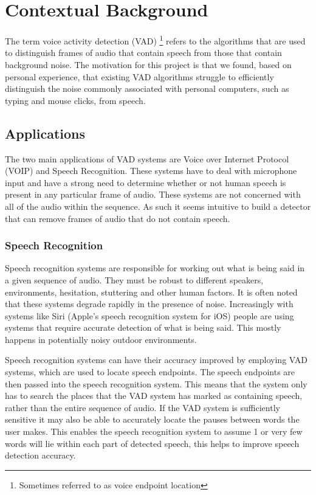 \documentclass[ %
                    author={Sam Phippen},
                supervisor={Dr. Rafal Bogacz},
                     title={Real time voice activity detectors in noisy personal computing environments},
                  subtitle={},
                    degree={MEng},
                      year={2012} ]{thesis}
\begin{document}
\chapter{Contextual Background}
\label{chap:context}

\vspace{1cm}

The term voice activity detection (VAD) \footnote{Sometimes referred to as voice
endpoint location\cite{Tuske}} refers to the algorithms that are used to
distinguish frames of audio that contain speech from those that contain
background noise\cite{ramirez}. The motivation for this project is that we
found, based on personal experience, that existing VAD algorithms struggle to
efficiently distinguish the noise commonly associated with personal computers,
such as typing and mouse clicks, from speech.

\section{Applications}

The two main applications of VAD systems are Voice over Internet Protocol
(VOIP) and Speech Recognition. These systems have to deal with microphone input
and have a strong need to determine whether or not human speech is present in
any particular frame of audio. These systems are not concerned with all of the
audio within the sequence. As such it seems intuitive to build a detector that
can remove frames of audio that do not contain speech.

\subsection{Speech Recognition}

Speech recognition systems are responsible for working out what is being said
in a given sequence of audio. They must be robust to different speakers,
environments, hesitation, stuttering and other human factors. It is often noted
that these systems degrade rapidly in the presence of noise\cite{Moreno}.
Increasingly with systems like Siri\texttrademark\cite{siri} (Apple's speech
recognition system for iOS\texttrademark) people are using systems that require
accurate detection of what is being said. This mostly happens in potentially
noisy outdoor environments.

Speech recognition systems can have their accuracy improved\cite{shin} by
employing VAD systems, which are used to locate speech endpoints. The speech
endpoints are then passed into the speech recognition system. This means that
the system only has to search the places that the VAD system has marked as
containing speech, rather than the entire sequence of audio. If the VAD system
is sufficiently sensitive it may also be able to accurately locate the pauses
between words the user makes. This enables the speech recognition system to
assume 1 or very few words will lie within each part of detected speech, this
helps to improve speech detection accuracy.
\end{document}
